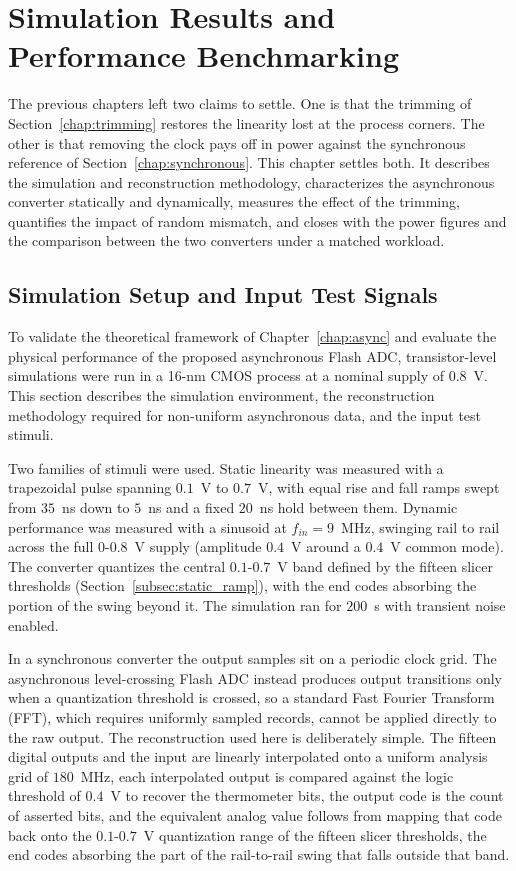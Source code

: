  
\chapter{Simulation Results and Performance Benchmarking} \label{chap:Benchmarking}

The previous chapters left two claims to settle. One is that the trimming of Section~\ref{chap:trimming} restores the linearity lost at the process corners. The other is that removing the clock pays off in power against the synchronous reference of Section~\ref{chap:synchronous}. This chapter settles both. It describes the simulation and reconstruction methodology, characterizes the asynchronous converter statically and dynamically, measures the effect of the trimming, quantifies the impact of random mismatch, and closes with the power figures and the comparison between the two converters under a matched workload.

\section{Simulation Setup and Input Test Signals}
\label{sec:simulation_setup}

To validate the theoretical framework of Chapter~\ref{chap:async} and evaluate the physical performance of the proposed asynchronous Flash ADC, transistor-level simulations were run in a 16-nm CMOS process at a nominal supply of 0.8~V. This section describes the simulation environment, the reconstruction methodology required for non-uniform asynchronous data, and the input test stimuli.

Two families of stimuli were used. Static linearity was measured with a trapezoidal pulse spanning $0.1$~V to $0.7$~V, with equal rise and fall ramps swept from $35$~ns down to $5$~ns and a fixed $20$~ns hold between them. Dynamic performance was measured with a sinusoid at $f_{in} = 9$~MHz, swinging rail to rail across the full $0$-$0.8$~V supply (amplitude $0.4$~V around a $0.4$~V common mode). The converter quantizes the central $0.1$-$0.7$~V band defined by the fifteen slicer thresholds (Section~\ref{subsec:static_ramp}), with the end codes absorbing the portion of the swing beyond it. The simulation ran for $200$~\textmu s with transient noise enabled.

In a synchronous converter the output samples sit on a periodic clock grid. The asynchronous level-crossing Flash ADC instead produces output transitions only when a quantization threshold is crossed, so a standard Fast Fourier Transform (FFT), which requires uniformly sampled records, cannot be applied directly to the raw output. The reconstruction used here is deliberately simple. The fifteen digital outputs and the input are linearly interpolated onto a uniform analysis grid of $180$~MHz, each interpolated output is compared against the logic threshold of $0.4$~V to recover the thermometer bits, the output code is the count of asserted bits, and the equivalent analog value follows from mapping that code back onto the $0.1$-$0.7$~V quantization range of the fifteen slicer thresholds, the end codes absorbing the part of the rail-to-rail swing that falls outside that band. 

